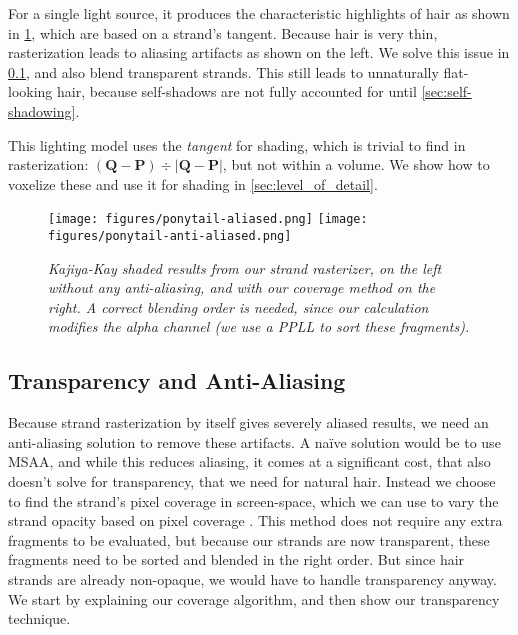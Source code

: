 \documentclass{egpubl}
\begin{document}
For a single light source, it produces the characteristic highlights of hair as shown in \cref{fig:aliasing}, which are based on a strand's tangent. Because hair is very thin, rasterization leads to aliasing artifacts as shown on the left. We solve this issue in \cref{sec:transparency_and_anti-aliasing}, and also blend transparent strands. This still leads to unnaturally flat-looking hair, because self-shadows are not fully accounted for until \cref{sec:self-shadowing}.


This lighting model uses the \emph{tangent} for shading, which is trivial to find in rasterization: \((\mathbf{Q} - \mathbf{P}) \div |\mathbf{Q} - \mathbf{P}|\), but not within a volume. We show how to voxelize these and use it for shading in \cref{sec:level_of_detail}.

\begin{figure}[htb]
    \centering
    \texttt{[image: figures/ponytail-aliased.png]}
    \texttt{[image: figures/ponytail-anti-aliased.png]}
    \caption{\emph{Kajiya-Kay shaded results from our strand rasterizer, on the left without any anti-aliasing, and with our coverage method on the right. A correct blending order is needed, since our calculation modifies the alpha channel (we use a PPLL to sort these fragments).}}
    \label{fig:aliasing}
    \vspace{-2mm}
\end{figure}

\subsection{Transparency and Anti-Aliasing} \label{sec:transparency_and_anti-aliasing}


Because strand rasterization by itself gives severely aliased results, we need an anti-aliasing solution to remove these artifacts. A naïve solution would be to use MSAA, and while this reduces aliasing, it comes at a significant cost, that also doesn't solve for transparency, that we need for natural hair. Instead we choose to find the strand's pixel coverage in screen-space, which we can use to vary the strand opacity based on pixel coverage \cite{persson2012geometric}. This method does not require any extra fragments to be evaluated, but because our strands are now transparent, these fragments need to be sorted and blended in the right order. But since hair strands are already non-opaque, we would have to handle transparency anyway. We start by explaining our coverage algorithm, and then show our transparency technique.
\end{document}

